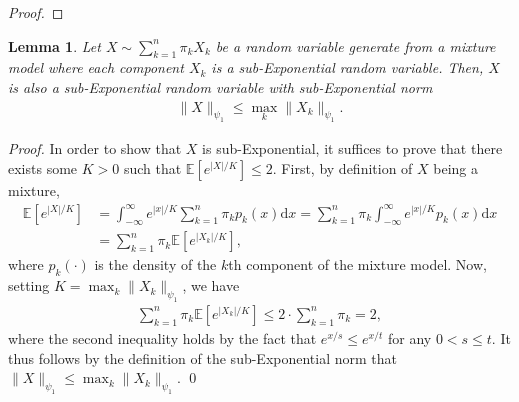 \documentclass[runningheads]{llncs}
\newcommand{\diff}{\mathrm{d}}
\newtheorem{lem}[theorem]{Lemma}
\begin{document}
\begin{subappendices}
\begin{proof}
\end{proof}
\begin{lem}
    \label{lem:sub_exp-mix}
    Let $X\sim \sum_{k=1}^n \pi_k X_k$ be a random variable generate from a
mixture model where each component $X_k$ is a sub-Exponential random variable.
Then, $X$ is also a sub-Exponential random variable with sub-Exponential norm
\begin{align*}
  \|X\|_{\psi_1} \leq \max_k \|X_k\|_{\psi_1}.
\end{align*}
\end{lem}
\begin{proof}
  In order to show that $X$ is sub-Exponential, it suffices to prove that there
  exists some $K>0$ such that $\mathbb{E}\left[e^{ |X| /K}\right] \leq 2$.
  First, by definition of $X$ being a mixture,
  \begin{align*}
    \mathbb{E}\left[e^{ |X| /K}\right]
    &= \int_{- \infty}^\infty e^{ |x| /K} \sum_{k=1}^n \pi_k p_k(x) \diff x
      =\sum_{k=1}^n \pi_k \int_{- \infty}^\infty e^{ |x| /K} p_k(x) \diff x
    \\
    &= \sum_{k=1}^n \pi_k\mathbb{E}\left[e^{ |X_k| /K}\right],
  \end{align*}
  where $p_k(\cdot)$ is the density of the $k$th component of the mixture model.
  Now, setting $K = \max_k \|X_k\|_{\psi_1}$, we have
  \begin{align*}
    \sum_{k=1}^n \pi_k\mathbb{E}\left[e^{ |X_k| /K} \right]
    \leq 2\cdot\sum_{k=1}^n
    \pi_k = 2,
  \end{align*}
  where the second inequality holds by the fact that $e^{x/s} \leq e^{x/t}$ for
  any $0 < s \leq t$. It thus follows by the definition of the sub-Exponential norm that $\|X\|_{\psi_1} \leq \max_k \|X_k\|_{\psi_1}.$ \qed
\end{proof}


\end{subappendices}
\end{document}
